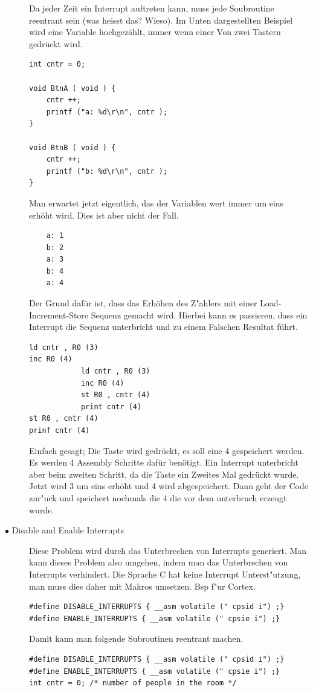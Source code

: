 \documentclass[a4paper, 8pt]{extarticle}
\begin{document}
\begin{multicols*}{3}
\begin{description}
								Da jeder Zeit ein Interrupt auftreten kann,  muss jede Soubroutine reentrant sein (was heisst das? Wieso).
								Im Unten dargestellten Beispiel wird eine Variable hochgezählt, immer wenn einer Von zwei Tastern gedrückt wird.
								\begin{lstlisting}
int cntr = 0;

void BtnA ( void ) {
	cntr ++;
	printf ("a: %d\r\n", cntr );
}

void BtnB ( void ) {
	cntr ++;
	printf ("b: %d\r\n", cntr );
}
								\end{lstlisting}
								Man erwartet jetzt eigentlich, das der Variablen wert immer um eins erhöht wird. Dies ist aber nicht der Fall.
								\begin{lstlisting}
	a: 1
	b: 2
	a: 3
	b: 4
	a: 4
								\end{lstlisting}
								Der Grund dafür ist, dass das Erhöhen des Z"ahlers mit einer Load-Increment-Store Sequenz gemacht wird. Hierbei kann 
								es passieren, dass ein Interrupt die Sequenz unterbricht und zu einem Falschen Resultat führt.
								\begin{lstlisting}
ld cntr , R0 (3)
inc R0 (4)
			ld cntr , R0 (3)
			inc R0 (4)
			st R0 , cntr (4)
			print cntr (4)
st R0 , cntr (4)
prinf cntr (4)
								\end{lstlisting}
								Einfach gesagt; Die Taste wird gedrückt, es soll eine 4 gespeichert werden. Es werden 4 Assembly Schritte dafür benötigt.
								Ein Interrupt unterbricht aber beim zweiten Schritt, da die Taste ein Zweites Mal gedrückt wurde. Jetzt wird 3 um eins erhöht und 4 wird abgespeichert.
								Dann geht der Code zur"uck und speichert nochmals die 4 die vor dem unterbruch erzeugt wurde. 
							\item[$\bullet$ Disable and Enable Interrupts] 	
								Diese Problem wird durch das Unterbrechen von Interrupts generiert. Man kann dieses Problem also umgehen, indem man
								das Unterbrechen von Interrupts verhindert. Die Sprache C hat keine Interrupt Unterst"utzung, man muss dies daher mit
								Makros umsetzen. Bsp f"ur Cortex.
								\begin{lstlisting}
#define DISABLE_INTERRUPTS { __asm volatile (" cpsid i") ;}
#define ENABLE_INTERRUPTS { __asm volatile (" cpsie i") ;}
								\end{lstlisting}
								Damit kann man folgende Subroutinen reentrant machen.
								\begin{lstlisting}
#define DISABLE_INTERRUPTS { __asm volatile (" cpsid i") ;}
#define ENABLE_INTERRUPTS { __asm volatile (" cpsie i") ;}
int cntr = 0; /* number of people in the room */


\end{lstlisting}
\end{description}
\end{multicols*}
\end{document}

